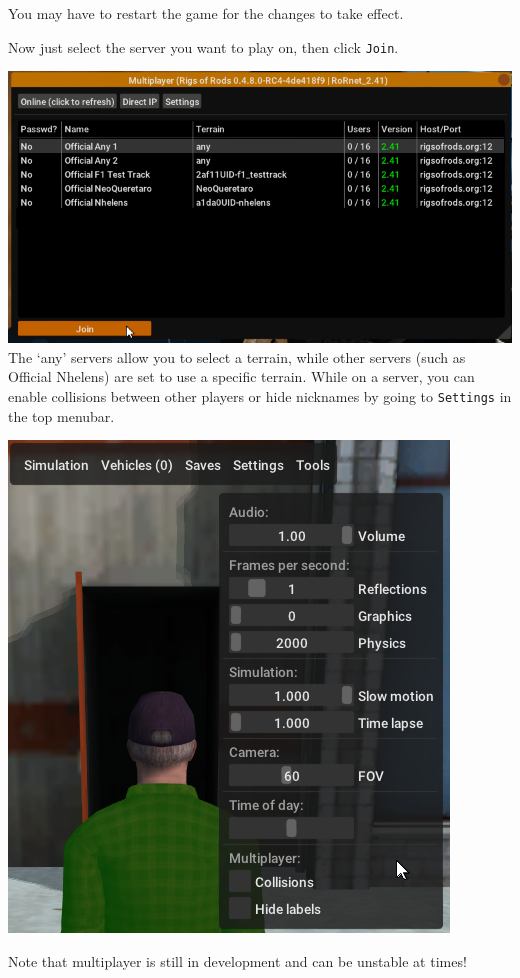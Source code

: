 You may have to restart the game for the changes to take effect.

Now just select the server you want to play on, then click
\texttt{Join}.

\includegraphics{images/bg-mp3.png}
The `any' servers allow you to select a terrain, while other servers
(such as Official Nhelens) are set to use a specific terrain.
While on a server, you can enable collisions between other players or
hide nicknames by going to \texttt{Settings} in the top menubar.

\includegraphics{images/bg-mp4.png}

Note that multiplayer is still in development and can be unstable at
times!
